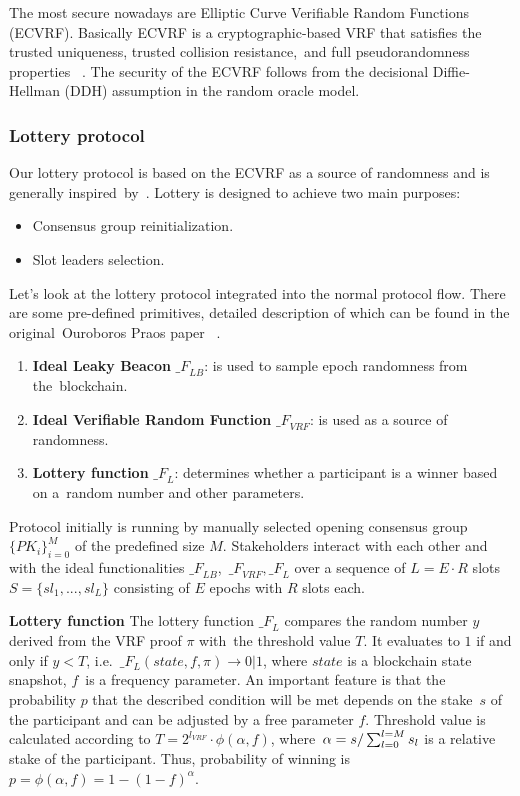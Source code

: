 The most secure nowadays are Elliptic Curve Verifiable Random Functions (ECVRF).
Basically ECVRF is a cryptographic-based VRF that satisfies the trusted uniqueness, trusted collision resistance,\
and full pseudorandomness properties ~\cite{cryptoeprint:2014/905}.
The security of the ECVRF follows from the decisional Diffie-Hellman (DDH) assumption in the random oracle model.

\subsubsection{Lottery protocol}
Our lottery protocol is based on the ECVRF as a source of randomness and is generally inspired\
by~\cite{cryptoeprint:2017/573}.
Lottery is designed to achieve two main purposes:
\begin{itemize}
    \item Consensus group reinitialization.
    \item Slot leaders selection.
\end{itemize}

Let's look at the lottery protocol integrated into the normal protocol flow.
There are some pre-defined primitives, detailed description of which can be found in the original\
Ouroboros Praos paper ~\cite{cryptoeprint:2017/573}.
\begin{enumerate}
    \item \textbf{Ideal Leaky Beacon} ${\mathcal_{F}}_{LB}$: is used to sample epoch randomness from the\
    blockchain.
    \item \textbf{Ideal Verifiable Random Function} ${\mathcal_{F}}_{VRF}$: is used as a source of randomness.
    \item \textbf{Lottery function} ${\mathcal_{F}}_{L}$: determines whether a participant is a winner based on a\
    random number and other parameters.
\end{enumerate}
Protocol initially is running by manually selected opening consensus group $\{PK_i\}_{i=0}^M$ of the predefined size $M$.
Stakeholders interact with each other and with the ideal functionalities ${\mathcal_{F}}_{LB}$,\
${\mathcal_{F}}_{VRF}, {\mathcal_{F}}_{L}$ over a sequence of $L = E \cdot R$ slots\
${S=\{sl_1,...,sl_L\}}$ consisting of $E$ epochs with $R$ slots each.

\textbf{Lottery function}
The lottery function ${\mathcal_{F}}_{L}$ compares the random number $y$ derived from the VRF proof $\pi$ with\
the threshold value $T$.
It evaluates to $1$ if and only if ${y < T}$, i.e.\
${\mathcal_{F}}_{L}(state, f, \pi) \rightarrow 0|1$, where $state$ is a blockchain state snapshot, $f$\
is a frequency parameter.
An important feature is that the probability $p$ that the described condition will be met depends on the stake\
$s$ of the participant and can be adjusted by a free parameter $f$.
Threshold value is calculated according to ${T = 2^{l_{VRF}}\cdot \phi(\alpha, f)}$, where\
${\alpha=s/\\\sum_{l=0}^{l=M} s_l}$ is a relative stake of the participant.
Thus, probability of winning is ${p = \phi(\alpha, f) = 1-(1-f)^{\alpha}}$.

